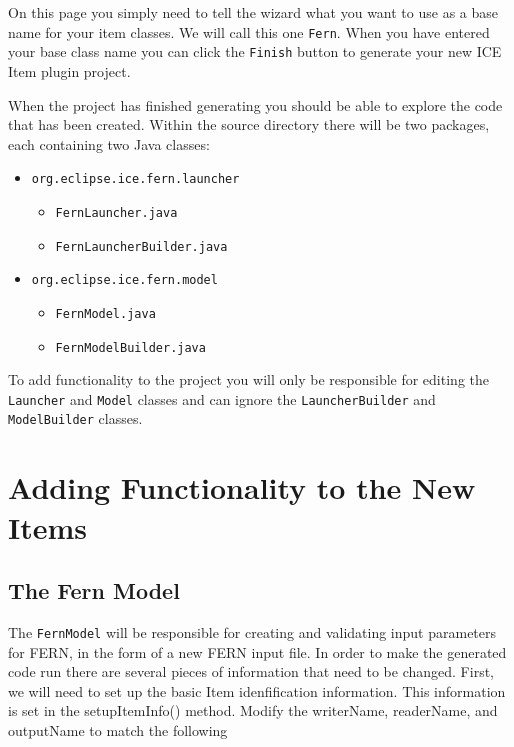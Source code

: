 On this page you simply need to tell the wizard what you want to use as a base
name for your item classes.  We will call this one \texttt{Fern}. 
When you have entered your base class name you can
click the \texttt{Finish} button to generate your new ICE Item plugin project.

When the project has finished generating you should be able to explore the code
that has been created.  Within the source directory there will be two packages,
each containing two Java classes:

\begin{itemize} 
    \item \texttt{org.eclipse.ice.fern.launcher} 
    \begin{itemize}
        \item \texttt{FernLauncher.java} 
        \item \texttt{FernLauncherBuilder.java}
    \end{itemize} 
    \item \texttt{org.eclipse.ice.fern.model} 
    \begin{itemize} 
        \item \texttt{FernModel.java} 
        \item \texttt{FernModelBuilder.java}
    \end{itemize} 
\end{itemize}

To add functionality to the project you will only be responsible for editing
the \texttt{Launcher} and \texttt{Model} classes and can ignore the
\texttt{LauncherBuilder} and \texttt{ModelBuilder} classes.


\section*{Adding Functionality to the New Items}

\subsection*{The Fern Model}

The \texttt{FernModel} will be responsible for creating and
validating input parameters for FERN, in the form of a new FERN input file.  In
order to make the generated code run there are several pieces of information that need to be changed.  First, we
will need to set up the basic Item idenfification information. This information
is set in the setupItemInfo() method. Modify the writerName, readerName, and
outputName to match the following

